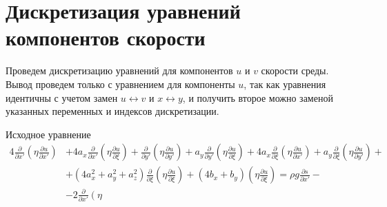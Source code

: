 \section*{Дискретизация уравнений компонентов скорости}

Проведем дискретизацию уравнений для компонентов $u$ и $v$
скорости среды. Вывод проведем только с уравнением для
компоненты $u$, так как уравнения идентичны с учетом замен
$u \leftrightarrow v$ и $x \leftrightarrow y$, и получить
второе можно заменой указанных переменных и индексов
дискретизации.

Исходное уравнение
\begin{equation*}
    \begin{split}
        4
        \frac
        {\partial }
        {\partial x'}
        \left(
        \eta
        \frac
        {\partial u}
        {\partial x'}
        \right)
        &
        +
        4
        a_x
        \frac
        {\partial }
        {\partial x'}
        \left(
        \eta
        \frac
        {\partial u}
        {\partial \xi}
        \right)
        +
        \frac
        {\partial }
        {\partial y'}
        \left(
        \eta
        \frac
        {\partial u}
        {\partial y'}
        \right)
        +
        a_y
        \frac
        {\partial }
        {\partial y'}
        \left(
        \eta
        \frac
        {\partial u}
        {\partial \xi}
        \right)
        +
        4
        a_x
        \frac
        {\partial }
        {\partial \xi}
        \left(
        \eta
        \frac
        {\partial u}
        {\partial x'}
        \right)
        +
        a_y
        \frac
        {\partial }
        {\partial \xi}
        \left(
        \eta
        \frac
        {\partial u}
        {\partial y'}
        \right)
        +
        \\
        &
        +
        \left(
        4
        a^2_x
        +
        a^2_y
        +
        a^2_z
        \right)
        \frac
        {\partial }
        {\partial \xi}
        \left(
        \eta
        \frac
        {\partial u}
        {\partial \xi}
        \right)
        +
        \left(
        4
        b_x
        +
        b_y
        \right)
        \left(
        \eta
        \frac
        {\partial u}
        {\partial \xi}
        \right)
        =
        \rho
        g
        \frac
        {\partial s}
        {\partial x'}
        -
        \\
        &
        -
        2
        \frac
        {\partial }
        {\partial x'}
        \left(
        \eta

\end{split}
\end{equation*}

